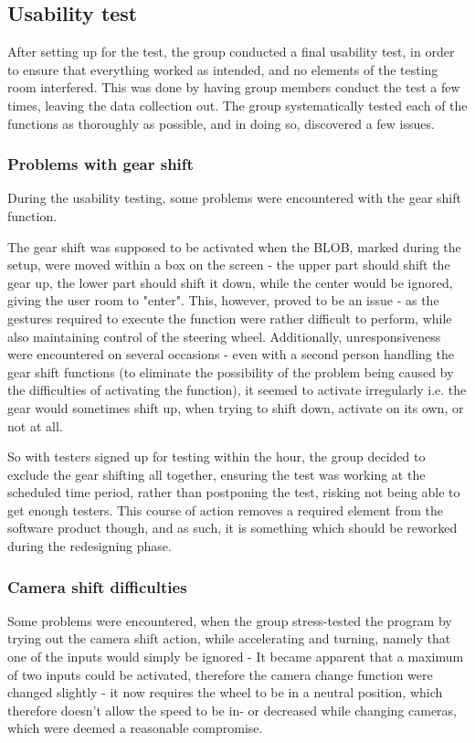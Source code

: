 \subsection{Usability test} \label{sec:usability}
After setting up for the test, the group conducted a final usability test, in order to ensure that everything worked as intended, and no elements of the testing room interfered.
This was done by having group members conduct the test a few times, leaving the data collection out. 
The group systematically tested each of the functions as thoroughly as possible, and in doing so, discovered a few issues.

\subsubsection{Problems with gear shift}
During the usability testing, some problems were encountered with the gear shift function.

The gear shift was supposed to be activated when the BLOB, marked during the setup, were moved within a box on the screen - the upper part should shift the gear up, the lower part should shift it down, while the center would be ignored, giving the user room to "enter". 
This, however, proved to be an issue - as the gestures required to execute the function were rather difficult to perform, while also maintaining control of the steering wheel. 
Additionally, unresponsiveness were encountered on several occasions - even with a second person handling the gear shift functions (to eliminate the possibility of the problem being caused by the difficulties of activating the function), it seemed to activate irregularly i.e. the gear would sometimes shift up, when trying to shift down, activate on its own, or not at all.


So with testers signed up for testing within the hour, the group decided to exclude the gear shifting all together, ensuring the test was working at the scheduled time period, rather than postponing the test, risking not being able to get enough testers. 
This course of action removes a required element from the software product though, and as such, it is something which should be reworked during the redesigning phase.

\subsubsection{Camera shift difficulties}
Some problems were encountered, when the group stress-tested the program by trying out the camera shift action, while accelerating and turning, namely that one of the inputs would simply be ignored - It became apparent that a maximum of two inputs could be activated, therefore the camera change function were changed slightly - it now requires the wheel to be in a neutral position, which therefore doesn't allow the speed to be in- or decreased while changing cameras, which were deemed a reasonable compromise.


